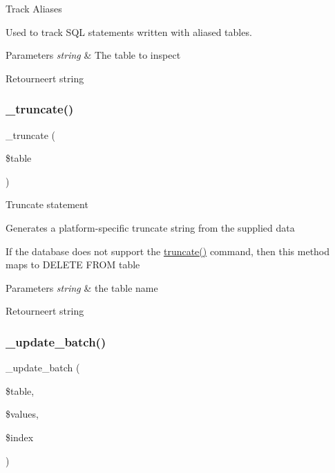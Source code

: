Track Aliases

Used to track S\+QL statements written with aliased tables.


\begin{DoxyParams}{Parameters}
{\em string} & The table to inspect \\
\hline
\end{DoxyParams}
\begin{DoxyReturn}{Retourneert}
string 
\end{DoxyReturn}
\mbox{\label{class_c_i___d_b__query__builder_aa029600528fc1ce660a23ff4b4667f95}} 
\subsubsection{\texorpdfstring{\_truncate()}{\_truncate()}}
{\footnotesize\ttfamily \+\_\+truncate (\begin{DoxyParamCaption}\item[{}]{\$table }\end{DoxyParamCaption})\hspace{0.3cm}{\ttfamily [protected]}}

Truncate statement

Generates a platform-\/specific truncate string from the supplied data

If the database does not support the \mbox{\hyperlink{class_c_i___d_b__query__builder_acaa636a6a61d4362c5a32941fc9932ba}{truncate()}} command, then this method maps to \textquotesingle{}D\+E\+L\+E\+TE F\+R\+OM table\textquotesingle{}


\begin{DoxyParams}{Parameters}
{\em string} & the table name \\
\hline
\end{DoxyParams}
\begin{DoxyReturn}{Retourneert}
string 
\end{DoxyReturn}
\mbox{\label{class_c_i___d_b__query__builder_a336b9ebb119e47b6a84bb7fc9d4dae93}} 
\subsubsection{\texorpdfstring{\_update\_batch()}{\_update\_batch()}}
{\footnotesize\ttfamily \+\_\+update\+\_\+batch (\begin{DoxyParamCaption}\item[{}]{\$table,  }\item[{}]{\$values,  }\item[{}]{\$index }\end{DoxyParamCaption})\hspace{0.3cm}{\ttfamily [protected]}}

